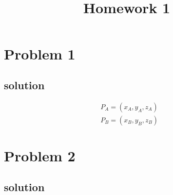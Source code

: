 \documentclass[12pt]{kjleehw}
\begin{document}
\title{\textbf{Homework 1}}


\section{Problem 1}
\subsection*{solution} %

\begin{align*}
& P_A = (x_A,y_A,z_A)\\
& P_B = (x_B,y_B,z_B)
\end{align*}

\newpage

\section{Problem 2}
\subsection*{solution}

\newpage
\end{document}
